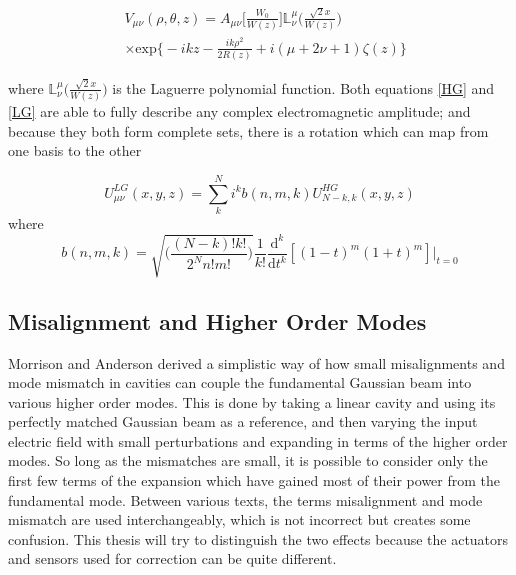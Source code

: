 		\begin{equation}\label{LG}
		\begin{aligned}
		&V_{\mu\nu}(\rho,\theta,z) = A_{\mu\nu}\bigg[ \frac{W_0}{W(z)} \bigg] \mathbb{L}^{\mu}_{\nu} \Bigg( \frac{\sqrt{2}x}{W(z)}  \Bigg) \\
		&\times \text{exp} \bigg\{-ikz-\frac{ik\rho^2}{2R(z)} + i(\mu+2\nu+1)\zeta(z) \bigg\}
		\end{aligned}
		\end{equation}
		
		where $\mathbb{L}^{\mu}_{\nu} \Big( \frac{\sqrt{2}x}{W(z)}  \Big)$ is the Laguerre polynomial function. Both equations \ref{HG} and \ref{LG} are able to fully describe any complex electromagnetic amplitude; and because they both form complete sets, there is a rotation which can map from one basis to the other \cite{BEIJERSBERGEN} \cite{ONeilModeTransform}
		
		\begin{equation}
		U^{LG}_{\mu \nu} (x,y,z) = \sum\limits_{k}^{N} i^k b(n,m,k) U^{HG}_{N-k,k} (x,y,z)
		\end{equation}
		where
		\begin{equation}
		b(n,m,k) = \sqrt{\bigg( \frac{(N-k)!k!}{2^N n!m!} \bigg)} \frac{1}{k!} \frac{\text{d}^k}{\text{d}t^k}[(1-t)^m (1+t)^m]\vert_{t=0}
		\end{equation}

		\subsection{Misalignment and Higher Order Modes}\label{Misalign}
		Morrison and Anderson \cite{Anderson} \cite{Morrison} derived a simplistic way of how small misalignments and mode mismatch in cavities can couple the fundamental Gaussian beam into various higher order modes.  This is done by taking a linear cavity and using its perfectly matched Gaussian beam as a reference, and then varying the input electric field with small perturbations and expanding in terms of the higher order modes.  So long as the mismatches are small, it is possible to consider only the first few terms of the expansion which have gained most of their power from the fundamental mode.  Between various texts, the terms misalignment and mode mismatch are used interchangeably, which is not incorrect but creates some confusion.  This thesis will try to distinguish the two effects because the actuators and sensors used for correction can be quite different.
		
